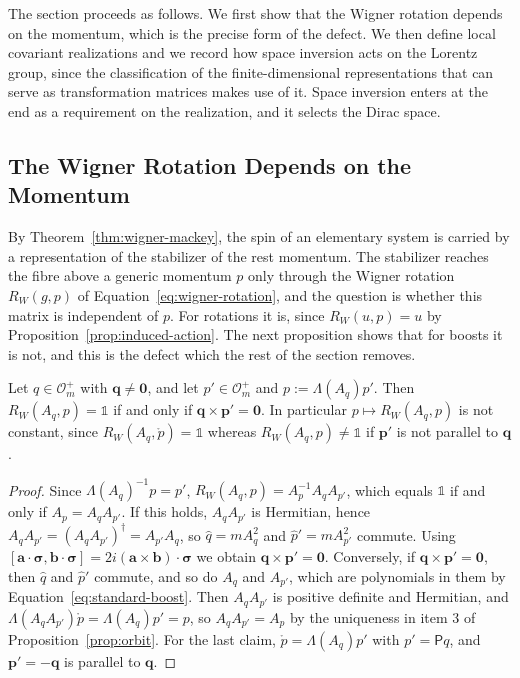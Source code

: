 	The section proceeds as follows. We first show that the Wigner rotation depends on the momentum, which is the precise form of the defect. We then define local covariant realizations and we record how space inversion acts on the Lorentz group, since the classification of the finite-dimensional representations that can serve as transformation matrices makes use of it. Space inversion enters at the end as a requirement on the realization, and it selects the Dirac space.
	
	\subsection*{The Wigner Rotation Depends on the Momentum}
	
	By Theorem~\ref{thm:wigner-mackey}, the spin of an elementary system is carried by a representation of the stabilizer of the rest momentum. The stabilizer reaches the fibre above a generic momentum $p$ only through the Wigner rotation $R_W(g,p)$ of Equation~\eqref{eq:wigner-rotation}, and the question is whether this matrix is independent of $p$. For rotations it is, since $R_W(u,p)=u$ by Proposition~\ref{prop:induced-action}. The next proposition shows that for boosts it is not, and this is the defect which the rest of the section removes.
	
	\begin{proposition}\label{prop:wigner-rotation}
		Let $q\in\mathcal{O}_m^+$ with $\mathbf{q}\neq\mathbf{0}$, and let $p'\in\mathcal{O}_m^+$ and $p:=\Lambda(A_q)p'$. Then $R_W(A_q,p)=\mathbb{1}$ if and only if $\mathbf{q}\times\mathbf{p}'=\mathbf{0}$. In particular $p\mapsto R_W(A_q,p)$ is not constant, since $R_W(A_q,\mathring{p})=\mathbb{1}$ whereas $R_W(A_q,p)\neq\mathbb{1}$ if $\mathbf{p}'$ is not parallel to $\mathbf{q}$.
	\end{proposition}
	
	\begin{proof}
		Since $\Lambda(A_q)^{-1}p=p'$, $R_W(A_q,p)=A_p^{-1}A_qA_{p'}$, which equals $\mathbb{1}$ if and only if $A_p=A_qA_{p'}$. If this holds, $A_qA_{p'}$ is Hermitian, hence $A_qA_{p'}=(A_qA_{p'})^\dagger=A_{p'}A_q$, so $\hat{q}=mA_q^2$ and $\hat{p}'=mA_{p'}^2$ commute. Using $[\mathbf{a}\cdot\boldsymbol{\sigma},\mathbf{b}\cdot\boldsymbol{\sigma}]=2i(\mathbf{a}\times\mathbf{b})\cdot\boldsymbol{\sigma}$ we obtain $\mathbf{q}\times\mathbf{p}'=\mathbf{0}$. Conversely, if $\mathbf{q}\times\mathbf{p}'=\mathbf{0}$, then $\hat{q}$ and $\hat{p}'$ commute, and so do $A_q$ and $A_{p'}$, which are polynomials in them by Equation~\eqref{eq:standard-boost}. Then $A_qA_{p'}$ is positive definite and Hermitian, and $\Lambda(A_qA_{p'})\mathring{p}=\Lambda(A_q)p'=p$, so $A_qA_{p'}=A_p$ by the uniqueness in item 3 of Proposition~\ref{prop:orbit}. For the last claim, $\mathring{p}=\Lambda(A_q)p'$ with $p'=\mathsf{P}q$, and $\mathbf{p}'=-\mathbf{q}$ is parallel to $\mathbf{q}$.
	\end{proof}
	
